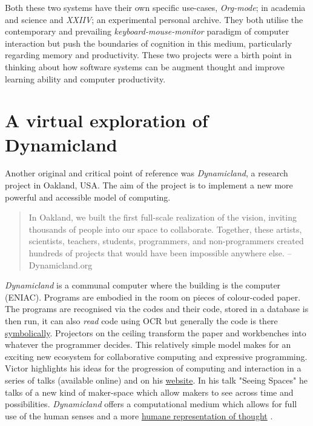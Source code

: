 \documentclass[12pt]{report}
\begin{document}
Both these two systems have their own specific use-cases, \emph{Org-mode}; in
academia and science and \emph{XXIIV}; an experimental personal archive. They both
utilise the contemporary and prevailing \emph{keyboard-mouse-monitor} paradigm
of computer interaction but push the boundaries of cognition in this medium,
particularly regarding memory and productivity. These two projects were a birth
point in thinking about how software systems can be augment thought and improve
learning ability and computer productivity.


\section{A virtual exploration of Dynamicland}
\label{sec:org4337574}

Another original and critical point of reference was \emph{Dynamicland}, a research
project in Oakland, USA. The aim of the project is to implement a new more
powerful and accessible model of computing.

\begin{quote}


In Oakland, we built the first full-scale realization of the vision, inviting
thousands of people into our space to collaborate. Together, these artists,
scientists, teachers, students, programmers, and non-programmers created
hundreds of projects that would have been impossible anywhere else.
-- Dynamicland.org 
\end{quote}


\emph{Dynamicland} is a communal computer where the building is the computer (ENIAC).
Programs are embodied in the room on pieces of colour-coded paper. The programs
are recognised via the codes and their code, stored in a database is then run,
it can also \emph{read} code using OCR but generally the code is there \href{https://thenewstack.io/dynamicland-rethinks-computer-interfaces/}{symbolically}.
Projectors on the ceiling transform the paper and workbenches into whatever the
programmer decides. This relatively simple model makes for an exciting new
ecosystem for collaborative computing and expressive programming. Victor
highlights his ideas for the progression of computing and interaction in a
series of talks (available online) and on his \href{http://worrydream.com}{website}. In his talk "Seeing
Spaces" he talks of a new kind of maker-space which allow makers to see across
time and possibilities. \emph{Dynamicland} offers a computational medium which allows
for full use of the human senses and a more \href{https://vimeo.com/115154289}{humane representation of thought}
\cite{VictorKayDynamicLand}. \\
\end{document}

